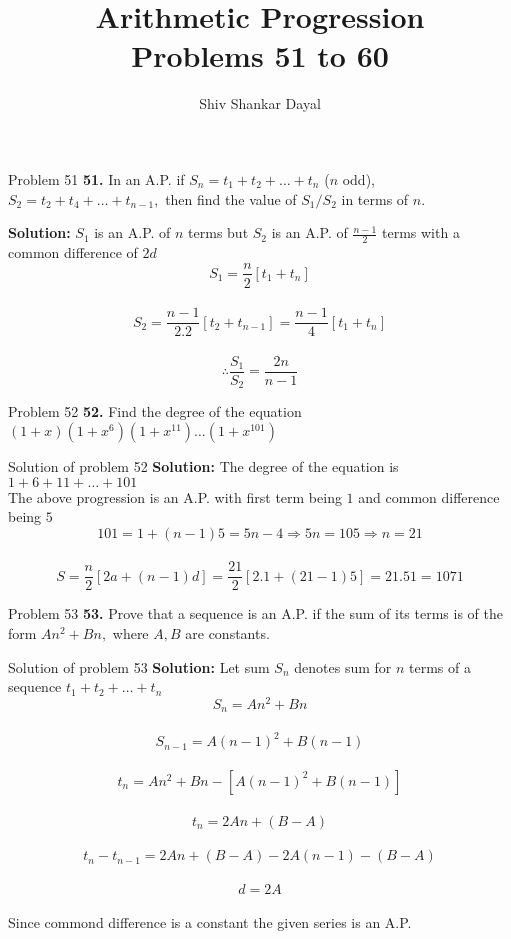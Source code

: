 \documentclass[aspectratio=1610,8pt]{beamer}
\title{Arithmetic Progression\\Problems 51 to 60}
\author[Shiv Shankar Dayal]{Shiv Shankar Dayal}
\begin{document}
\begin{frame}
       \titlepage
\end{frame}
\begin{frame}{Problem 51}
  \textbf{51.} In an A.P. if $S_n = t_1 + t_2 + \ldots + t_n$ ($n$ odd), $S_2
  = t_2 + t_4 + \ldots + t_{n - 1},$ then find the value of $S_1/S_2$ in terms
  of $n.$
\end{frame}
\begin{frame}
  \textbf{Solution:} $S_1$ is an A.P. of $n$ terms but $S_2$ is an A.P. of
  $\frac{n - 1}{2}$ terms with a common difference of $2d$\\
  $$S_1 = \frac{n}{2}[t_1 + t_n]$$\\
  $$S_2 = \frac{n - 1}{2.2}[t_2 + t_{n - 1}] = \frac{n - 1}{4}[t_1 + t_n]$$\\
  $$\therefore \frac{S_1}{S_2} = \frac{2n}{n - 1}$$
\end{frame}
\begin{frame}{Problem 52}
  \textbf{52.} Find the degree of the equation $(1 + x)(1 + x^6)(1 +
  x^{11})\ldots (1+ x^{101})$
\end{frame}
\begin{frame}{Solution of problem 52}
  \textbf{Solution:} The degree of the equation is $1 + 6 + 11 + \ldots +
  101$\\
  The above progression is an A.P. with first term being $1$ and common
  difference being $5$\\
  $$101 = 1 + (n - 1)5 = 5n - 4 \Rightarrow 5n = 105\Rightarrow n = 21$$\\
  $$S = \frac{n}{2}[2a + (n - 1)d] = \frac{21}{2}[2.1 + (21 - 1)5] = 21.51 =
  1071$$
\end{frame}
\begin{frame}{Problem 53}
  \textbf{53.} Prove that a sequence is an A.P. if the sum of its terms is of
  the form $An^2 + Bn,$ where $A, B$ are constants.
\end{frame}
\begin{frame}{Solution of problem 53}
  \textbf{Solution:} Let sum $S_n$ denotes sum for $n$ terms of a sequence $t_1
  + t_2 + \ldots + t_n$\\
  $$S_n = An^2 + Bn$$\\
  $$S_{n - 1} = A(n - 1)^2 + B(n - 1)$$\\
  $$t_n = An^2 + Bn - [A(n - 1)^2 + B(n - 1)]$$\\
  $$t_n = 2An + (B - A)$$\\
  $$t_n - t_{n - 1} = 2An + (B - A) - 2A(n - 1) - (B - A)$$\\
  $$d = 2A$$\\
  Since commond difference is a constant the given series is an A.P.
\end{frame}
\end{document}
